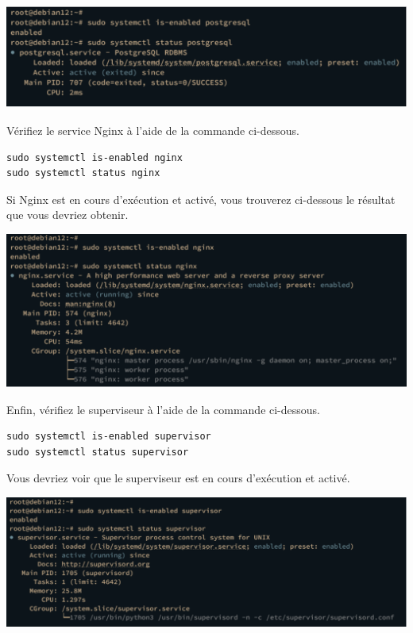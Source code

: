 \documentclass{article}
\begin{document}
\begin{center}
\includegraphics[width=15cm]{images/image02.png}
\end{center}
Vérifiez le service Nginx à l'aide de la commande ci-dessous.
\begin{verbatim}
sudo systemctl is-enabled nginx
sudo systemctl status nginx
\end{verbatim}
Si Nginx est en cours d'exécution et activé, vous trouverez ci-dessous le résultat que vous devriez obtenir.
\begin{center}
\includegraphics[width=15cm]{images/image03.png}
\end{center}
Enfin, vérifiez le superviseur à l'aide de la commande ci-dessous.

\begin{verbatim}
sudo systemctl is-enabled supervisor
sudo systemctl status supervisor
\end{verbatim}

Vous devriez voir que le superviseur est en cours d'exécution et activé.
\begin{center}
\includegraphics[width=15cm]{images/image04.png}
\end{center}
\end{document}
